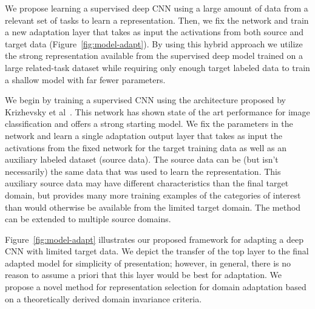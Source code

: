 
We propose learning a supervised deep CNN using a large amount of
data from a relevant set of tasks to learn a representation. Then, we fix the network and train a new adaptation layer
that takes as input the activations from both source and target data (Figure~\ref{fig:model-adapt}). By
using this hybrid approach we utilize the strong representation available from
the supervised deep model trained on a large related-task dataset while requiring only
enough target labeled data to train a shallow model with far fewer parameters.

We begin by training a supervised CNN using the architecture proposed by 
Krizhevsky et al~\cite{supervision}. This network has shown state of the art
performance for image classification and offers a strong starting model.
We fix the 
parameters in the
network and learn a single adaptation output layer that takes as input
the activations from the fixed network for the target training data as well as an auxiliary labeled
dataset (source data). The source data
can be (but isn't necessarily) the same data that was used to learn the representation.
This auxiliary source data may have different characteristics than the final target domain, but
provides many more training examples of the categories of interest than would otherwise be available from the limited target domain. The method can be extended to multiple source domains.

Figure~\ref{fig:model-adapt} illustrates our proposed framework for adapting a deep CNN with limited target data.
We depict the transfer of the top layer to the final adapted model for simplicity of presentation; however, in general, there is no reason to assume a priori that this layer would be best for adaptation.
We propose a novel method for representation selection for domain adaptation based on a theoretically derived domain invariance criteria.


